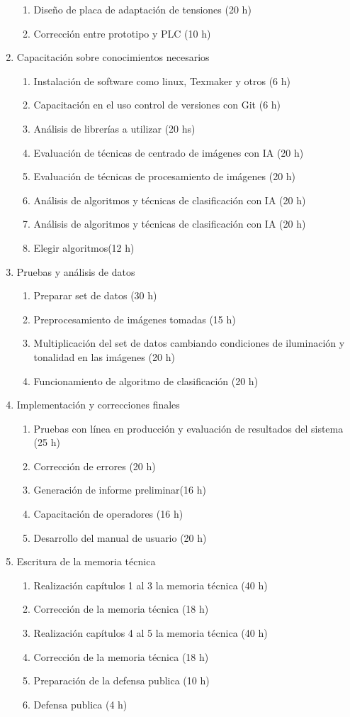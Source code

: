 \documentclass[11pt]{charter}
\begin{document}
\begin{enumerate}
\begin{enumerate}
	\item Diseño de placa de adaptación de tensiones (20 h)
	\item Corrección entre prototipo y PLC (10 h)
	\end{enumerate}
\item Capacitación sobre conocimientos necesarios
	\begin{enumerate}
	\item Instalación de software como linux, Texmaker y otros (6 h)
	\item Capacitación en el uso control de versiones con Git (6 h)
	\item Análisis de librerías a utilizar (20 hs)
	\item Evaluación de técnicas de centrado de imágenes con IA (20 h) 
	\item Evaluación de técnicas de procesamiento de imágenes (20 h)
	\item Análisis de algoritmos y técnicas de clasificación con IA (20 h)

	\item Análisis de algoritmos y técnicas de clasificación con IA (20 h)
	\item Elegir algoritmos(12 h)
	\end{enumerate}
\item Pruebas y análisis de datos
	\begin{enumerate}
	\item Preparar set de datos (30 h)
	\item Preprocesamiento de imágenes tomadas (15 h)
	\item Multiplicación del set de datos cambiando condiciones de iluminación y tonalidad en las imágenes (20 h)
	\item Funcionamiento de algoritmo de clasificación (20 h)
	\end{enumerate}
\item Implementación y correcciones finales
	\begin{enumerate}
	\item Pruebas con línea en producción y evaluación de resultados del sistema (25 h)
	\item Corrección de errores (20 h)
	\item Generación de informe preliminar(16 h)
	\item Capacitación de operadores (16 h)
	\item Desarrollo del manual de usuario (20 h)
	\end{enumerate}
\item Escritura de la memoria técnica
	\begin{enumerate}
	\item Realización capítulos 1 al 3 la memoria técnica (40 h) 
	\item Corrección de la memoria técnica (18 h)
	\item Realización capítulos 4 al 5 la memoria técnica (40 h)
	\item Corrección de la memoria técnica (18 h)
	\item Preparación de la defensa publica (10 h)
	\item Defensa publica (4 h)
	

\end{enumerate}
\end{enumerate}
\end{document}
